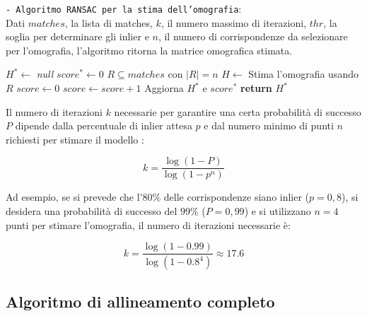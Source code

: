 \begin{algorithm}[H]
    \caption{\texttt{- Algoritmo RANSAC per la stima dell'omografia}:\\ Dati $matches$, la lista di matches, $k$, il numero massimo di iterazioni, $thr$, la soglia per determinare gli inlier e $n$, il numero di corrispondenze da selezionare per l'omografia, l'algoritmo ritorna la matrice omografica stimata.} \label{alg:ransac}
    \begin{algorithmic}[1]
            \State $H^* \gets$ \textit{null} 
            \State $score^* \gets 0$ 
                \State $R \subseteq matches$ con $|R| = n$ 
                \State $H \gets$ Stima l'omografia usando $R$
                \State $score \gets 0$
                     
                        \State $score \gets score + 1$ 
                    \EndIf
                \EndFor
                 
                    \State Aggiorna $H^*$ e $score^*$
                \EndIf
            \EndFor
            \State \textbf{return} $H^*$
        \EndFunction
    \end{algorithmic}
\end{algorithm}

Il numero di iterazioni $k$ necessarie per garantire una certa probabilità di successo $P$ dipende dalla percentuale di inlier attesa $p$ e dal numero minimo di punti $n$ richiesti per stimare il modello \cite{ransac_analysis}:

$$
k = \dfrac{\log(1 - P)}{\log(1 - p^n)}
$$

Ad esempio, se si prevede che l'$80\%$ delle corrispondenze siano inlier ($p=0,8$), si desidera una probabilità di successo del $99\%$ ($P=0,99$) e si utilizzano $n=4$ punti per stimare l'omografia, il numero di iterazioni necessarie è:

$$
k = \dfrac{\log(1 - 0.99)}{\log(1 - 0.8^4)} \approx 17.6
$$

\subsection{Algoritmo di allineamento completo} \label{subsec:alignment_complete}

